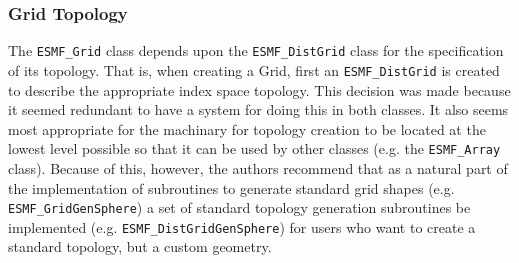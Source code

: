 


\subsubsection{Grid Topology} 

The {\tt ESMF\_Grid} class depends upon the {\tt ESMF\_DistGrid} class
for the specification of its topology. That is, when 
creating a Grid, first an {\tt ESMF\_DistGrid} is created to describe the 
appropriate index space topology. This decision was
made because it seemed redundant to have a system for doing this
in both classes. It also seems most appropriate for
the machinary for topology creation to be located at the lowest
level possible so that it can be used by other
classes (e.g. the {\tt ESMF\_Array} class). Because of this, however,
the authors recommend that as a natural part of the 
implementation of subroutines to generate standard grid shapes
(e.g. {\tt ESMF\_GridGenSphere}) a set of standard
topology generation subroutines be implemented (e.g. {\tt ESMF\_DistGridGenSphere}) for users who want to create a standard topology, but a custom geometry.




